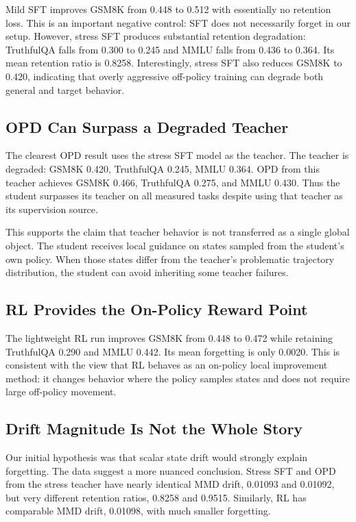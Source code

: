 \documentclass{article}
\begin{document}
Mild SFT improves GSM8K from 0.448 to 0.512 with essentially no retention loss.
This is an important negative control: SFT does not necessarily forget in our
setup. However, stress SFT produces substantial retention degradation:
TruthfulQA falls from 0.300 to 0.245 and MMLU falls from 0.436 to 0.364. Its
mean retention ratio is 0.8258. Interestingly, stress SFT also reduces GSM8K to
0.420, indicating that overly aggressive off-policy training can degrade both
general and target behavior.

\subsection{OPD Can Surpass a Degraded Teacher}

The clearest OPD result uses the stress SFT model as the teacher. The teacher is
degraded: GSM8K 0.420, TruthfulQA 0.245, MMLU 0.364. OPD from this teacher
achieves GSM8K 0.466, TruthfulQA 0.275, and MMLU 0.430. Thus the student
surpasses its teacher on all measured tasks despite using that teacher as its
supervision source.

This supports the claim that teacher behavior is not transferred as a single
global object. The student receives local guidance on states sampled from the
student's own policy. When those states differ from the teacher's problematic
trajectory distribution, the student can avoid inheriting some teacher failures.

\subsection{RL Provides the On-Policy Reward Point}

The lightweight RL run improves GSM8K from 0.448 to 0.472 while retaining
TruthfulQA 0.290 and MMLU 0.442. Its mean forgetting is only 0.0020. This is
consistent with the view that RL behaves as an on-policy local improvement
method: it changes behavior where the policy samples states and does not require
large off-policy movement.

\subsection{Drift Magnitude Is Not the Whole Story}

Our initial hypothesis was that scalar state drift would strongly explain
forgetting. The data suggest a more nuanced conclusion. Stress SFT and OPD from
the stress teacher have nearly identical MMD drift, 0.01093 and 0.01092, but very
different retention ratios, 0.8258 and 0.9515. Similarly, RL has comparable MMD
drift, 0.01098, with much smaller forgetting.
\end{document}
